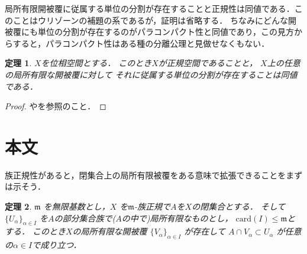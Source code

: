 \documentclass[leqno, a4paper, 12pt]{jsarticle}
\newtheorem{thm}{定理}
\newcommand{\card}{\mathrm{card}}
\begin{document}
局所有限開被覆に従属する単位の分割が存在することと正規性は同値である．このことはウリゾーンの補題の系であるが，証明は省略する．
ちなみにどんな開被覆にも単位の分割が存在するのがパラコンパクト性と同値であり，この見方からすると，パラコンパクト性はある種の分離公理と見做せなくもない．
\begin{thm}
$X$を位相空間とする．
このとき$X$が正規空間であることと，
$X$上の任意の局所有限な開被覆に対して
それに従属する単位の分割が存在することは同値である．
\end{thm}
\begin{proof}
\cite[Corollary 11.9]{nor}や\cite{dempa}を参照のこと．
\end{proof}

\section{本文}
族正規性があると，閉集合上の局所有限被覆をある意味で拡張できることをまずは示そう．
\begin{thm}\label{thm:saibun}
$\mathfrak{m}$
を無限基数とし，$X$
を$\mathfrak{m}$-族正規で$A$を$X$の閉集合とする．
そして$\{U_{\alpha}\}_{\alpha\in I}$
を$A$の部分集合族で($A$の中で)局所有限なものとし，
$\card(I)\le \mathfrak{m}$とする．
このとき$X$の局所有限な開被覆
$\{V_{\alpha}\}_{\alpha\in I}$
が存在して
$A\cap V_{\alpha}\subset U_{\alpha}$
が任意の$\alpha\in I$で成り立つ．
\end{thm}
\end{document}
